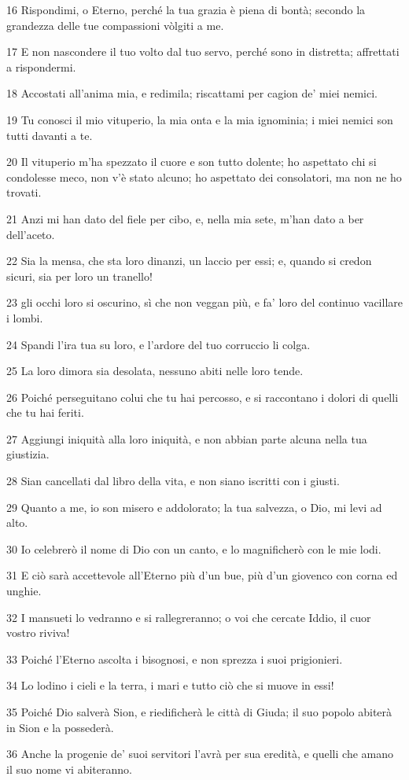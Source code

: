 \par 16 Rispondimi, o Eterno, perché la tua grazia è piena di bontà; secondo la grandezza delle tue compassioni vòlgiti a me.
\par 17 E non nascondere il tuo volto dal tuo servo, perché sono in distretta; affrettati a rispondermi.
\par 18 Accostati all'anima mia, e redimila; riscattami per cagion de' miei nemici.
\par 19 Tu conosci il mio vituperio, la mia onta e la mia ignominia; i miei nemici son tutti davanti a te.
\par 20 Il vituperio m'ha spezzato il cuore e son tutto dolente; ho aspettato chi si condolesse meco, non v'è stato alcuno; ho aspettato dei consolatori, ma non ne ho trovati.
\par 21 Anzi mi han dato del fiele per cibo, e, nella mia sete, m'han dato a ber dell'aceto.
\par 22 Sia la mensa, che sta loro dinanzi, un laccio per essi; e, quando si credon sicuri, sia per loro un tranello!
\par 23 gli occhi loro si oscurino, sì che non veggan più, e fa' loro del continuo vacillare i lombi.
\par 24 Spandi l'ira tua su loro, e l'ardore del tuo corruccio li colga.
\par 25 La loro dimora sia desolata, nessuno abiti nelle loro tende.
\par 26 Poiché perseguitano colui che tu hai percosso, e si raccontano i dolori di quelli che tu hai feriti.
\par 27 Aggiungi iniquità alla loro iniquità, e non abbian parte alcuna nella tua giustizia.
\par 28 Sian cancellati dal libro della vita, e non siano iscritti con i giusti.
\par 29 Quanto a me, io son misero e addolorato; la tua salvezza, o Dio, mi levi ad alto.
\par 30 Io celebrerò il nome di Dio con un canto, e lo magnificherò con le mie lodi.
\par 31 E ciò sarà accettevole all'Eterno più d'un bue, più d'un giovenco con corna ed unghie.
\par 32 I mansueti lo vedranno e si rallegreranno; o voi che cercate Iddio, il cuor vostro riviva!
\par 33 Poiché l'Eterno ascolta i bisognosi, e non sprezza i suoi prigionieri.
\par 34 Lo lodino i cieli e la terra, i mari e tutto ciò che si muove in essi!
\par 35 Poiché Dio salverà Sion, e riedificherà le città di Giuda; il suo popolo abiterà in Sion e la possederà.
\par 36 Anche la progenie de' suoi servitori l'avrà per sua eredità, e quelli che amano il suo nome vi abiteranno.

